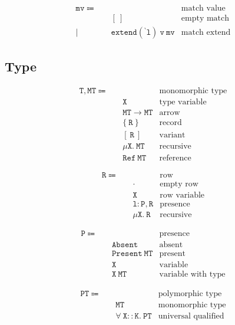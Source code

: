 \documentclass{report}
\newcommand{\code}{\mathtt}
\newcommand{\backtick}{{}^{\backprime}}
\begin{document}
\begin{align*}
\code{mv} \Coloneqq \quad & & \text{match value} \\
& \code{[\ ]} & \text{empty match} \\
| \quad & \code{extend(\backtick l)\ v\ mv} & \text{match extend}
\end{align*}

\subsection{Type}

\begin{align*}
\code{T, MT} \Coloneqq \quad & & \text{monomorphic type} \\
& \code{X} & \text{type variable} \\
& \code{MT \rightarrow MT} & \text{arrow} \\
& \code{\{\ R\ \}} & \text{record} \\
& \code{[\ R\ ]} & \text{variant} \\
& \code{\mu X.\ MT} & \text{recursive} \\
& \code{Ref\ MT} & \text{reference}
\end{align*}

\begin{align*}
\code{R} \Coloneqq \quad & & \text{row} \\
& \code{\cdot} & \text{empty row} \\
& \code{X} & \text{row variable} \\
& \code{l : P, R} & \text{presence} \\
& \code{\mu X.\ R} & \text{recursive}
\end{align*}

\begin{align*}
\code{P} \Coloneqq \quad & & \text{presence} \\
& \code{Absent} & \text{absent} \\
& \code{Present\ MT} & \text{present} \\
& \code{X} & \text{variable} \\
& \code{X\ MT} & \text{variable with type}
\end{align*}

\begin{align*}
\code{PT} \Coloneqq\quad & & \text{polymorphic type} \\
& \code{MT} & \text{monomorphic type} \\
& \code{\forall\ X :: K.\ PT} & \text{universal qualified}
\end{align*}
\end{document}

